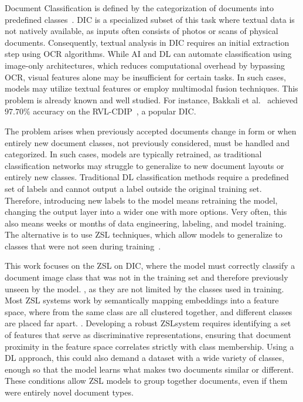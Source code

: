 Document Classification is defined by the categorization of documents into predefined classes~\cite{liu_document_2021}.
\gls{DIC} is a specialized subset of this task where textual data is not natively available, as inputs often consists of photos or scans of physical documents.
Consequently, textual analysis in \gls{DIC} requires an initial extraction step using \gls{OCR} algorithms.
While \gls{AI} and \gls{DL} can automate classification using image-only architectures, which reduces computational overhead by bypassing \gls{OCR}, visual features alone may be insufficient for certain tasks.
In such cases, models may utilize textual features or employ multimodal fusion techniques.
This problem is already known and well studied.
For instance, Bakkali et al.~\cite{bakkali_eaml_2021} achieved $97.70\%$ accuracy on the \gls{RVL-CDIP}~\cite{harley_evaluation_2015}, a popular \gls{DIC}.

The problem arises when previously accepted documents change in form or when entirely new document classes, not previously considered, must be handled and categorized. In such cases, models are typically retrained, as traditional classification networks may struggle to generalize to new document layouts or entirely new classes. Traditional \gls{DL} classification methods require a predefined set of labels and cannot output a label outside the original training set. Therefore, introducing new labels to the model means retraining the model, changing the output layer into a wider one with more options. Very often, this also means weeks or months of data engineering, labeling, and model training. The alternative is to use \gls{ZSL} techniques, which allow models to generalize to classes that were not seen during training~\cite{xian_zero-shot_2019}.


This work focuses on the \gls{ZSL} on \gls{DIC}, where the model must correctly classify a document image class that was not in the training set and therefore previously unseen by the model. , as they are not limited by the classes used in training. Most \gls{ZSL} systems work by semantically mapping embeddings into a feature space, where  from the same class are all clustered together, and different classes are placed far apart. . Developing a robust \gls{ZSL}system requires identifying a set of features that serve as discriminative representations, ensuring that document proximity in the feature space correlates strictly with class membership. Using a \gls{DL} approach, this could also demand a dataset with a wide variety of classes, enough so that the model learns what makes two documents similar or different. These conditions allow \gls{ZSL} models to group together documents, even if them were entirely novel document types.


